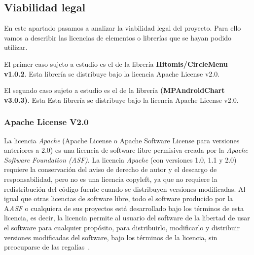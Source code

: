 \subsection{Viabilidad legal}
En este apartado pasamos a analizar la viabilidad legal del proyecto. Para ello vamos a describir las licencias de elementos o librerías que se hayan podido utilizar.

El primer caso sujeto a estudio es el de la librería \textbf{Hitomis/CircleMenu v1.0.2}. Esta librería se distribuye bajo la licencia Apache License v2.0.

El segundo caso sujeto a estudio es el de la librería \textbf{(MPAndroidChart v3.0.3)}. Esta Esta librería se distribuye bajo la licencia Apache License v2.0.
\subsubsection{Apache License V2.0}
La licencia \textit{Apache} (Apache License o Apache Software License para versiones anteriores a 2.0) es una licencia de software libre permisiva creada por la \textit{Apache Software Foundation (ASF)}. La licencia \textit{Apache} (con versiones 1.0, 1.1 y 2.0) requiere la conservación del aviso de derecho de autor y el descargo de responsabilidad, pero no es una licencia copyleft, ya que no requiere la redistribución del código fuente cuando se distribuyen versiones modificadas.
Al igual que otras licencias de software libre, todo el software producido por la A\textit{ASF} o cualquiera de sus proyectos está desarrollado bajo los términos de esta licencia, es decir, la licencia permite al usuario del software de la libertad de usar el software para cualquier propósito, para distribuirlo, modificarlo y distribuir versiones modificadas del software, bajo los términos de la licencia, sin preocuparse de las regalías~\cite{wiki:apachelicense}.


